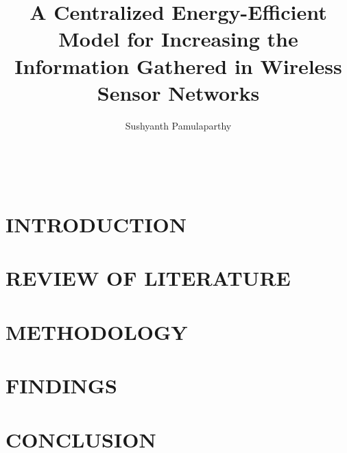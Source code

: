 \documentclass[12pt]{okstate-thesis}
\title{A Centralized Energy-Efficient Model for Increasing the Information Gathered in Wireless Sensor Networks}
\author{Sushyanth Pamulaparthy}
\begin{document}
\frontmatter
\maketitle
{} %


\begin{acknowledge}
    
    \\[10\baselineskip]
\end{acknowledge}
\begin{abstract} %
    
\end{abstract}
\tableofcontents
\listoffigures

%	

\mainmatter
\chapter{INTRODUCTION}

\label{intro}
\chapter{REVIEW OF LITERATURE}

\chapter{METHODOLOGY}

\label{methodology}
\chapter{FINDINGS}

\chapter{CONCLUSION}

%
\nocite{*} %

%

\end{document}
